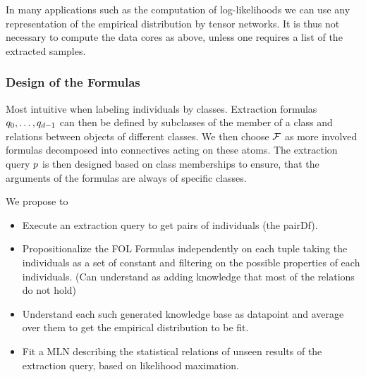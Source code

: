 % 
\begin{remark}
	In many applications such as the computation of log-likelihoods we can use any representation of the empirical distribution by tensor networks. 
	It is thus not necessary to compute the data cores as above, unless one requires a list of the extracted samples.
\end{remark}





\subsubsection{Design of the Formulas}

Most intuitive when labeling individuals by classes.
Extraction formulas $q_{0},\ldots,q_{d-1}$ can then be defined by subclasses of the member of a class and relations between objects of different classes. %
We then choose $\mathcal{F}$ as more involved formulas decomposed into connectives acting on these atoms.
The extraction query $p$ is then designed based on class memberships to ensure, that the arguments of the formulas are always of specific classes. %

We propose to
\begin{itemize}
	\item Execute an extraction query to get pairs of individuals (the pairDf).
	\item Propositionalize the FOL Formulas independently on each tuple taking the individuals as a set of constant and filtering on the possible properties of each individuals.
		(Can understand as adding knowledge that most of the relations do not hold)
	\item Understand each such generated knowledge base as datapoint and average over them to get the empirical distribution to be fit. 
	\item Fit a MLN describing the statistical relations of unseen results of the extraction query, based on likelihood maximation.
\end{itemize}





